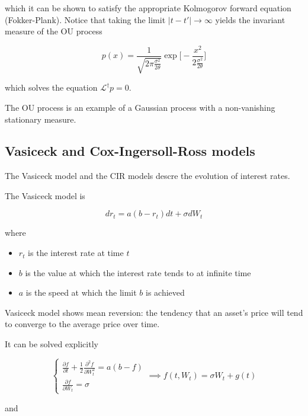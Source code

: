 \documentclass[11pt,a4paper]{article}
\begin{document}
which it can be shown to satisfy the appropriate Kolmogorov forward equation (Fokker-Plank). Notice that taking the limit $|t-t'|\to \infty$ yields the invariant measure of the OU process

\begin{equation}
    p(x) = \frac{1}{\sqrt{2\pi \frac{\sigma^2}{2\theta}}}\exp\Biggl[-\frac{x^2}{2\frac{\sigma^2}{2\theta}}\Biggl]
\end{equation}

which solves the equation $\mathcal{L}^{\dagger}p = 0$.

The OU process is an example of a Gaussian process with a non-vanishing stationary measure.

\subsection{Vasiceck and Cox-Ingersoll-Ross models}

The Vasiceck model and the CIR models descre the evolution of interest rates.

The Vasiceck model is

\begin{equation*}
    dr_t = a(b-r_t)dt + \sigma dW_t
\end{equation*}

where 

\begin{itemize}
    \item $r_t$ is the interest rate at time $t$
    \item $b$ is the value at which the interest rate tends to at infinite time
    \item $a$ is the speed at which the limit $b$ is achieved
\end{itemize}

Vasiceck model shows mean reversion: the tendency that an asset's price will tend to converge to the average price over time.

It can be solved explicitly

\begin{equation}
    \begin{cases}
        \frac{\partial f}{\partial t} + \frac{1}{2}\frac{\partial^2 f}{\partial W_t^2} = a(b-f)\\
    \frac{\partial f}{\partial W_t}  = \sigma       
    \end{cases} \implies f(t,W_t) = \sigma W_t + g(t)
\end{equation}

and 
\end{document}
